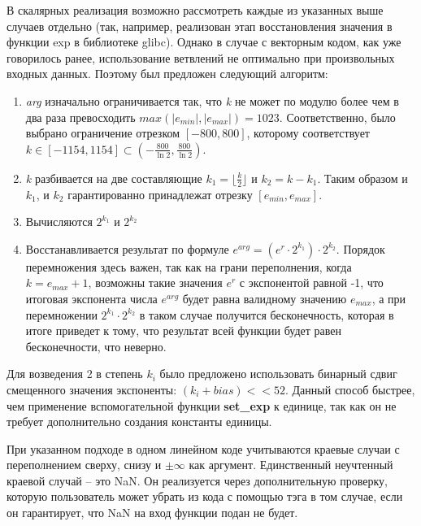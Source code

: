 В скалярных реализация возможно рассмотреть каждые из указанных выше случаев отдельно (так, например, реализован этап восстановления значения в функции exp в библиотеке glibc).
Однако в случае с векторным кодом, как уже говорилось ранее, использование ветвлений не оптимально при произвольных входных данных.
Поэтому был предложен следующий алгоритм:

\begin{enumerate}
    \item \textit{arg} изначально ограничивается так, что \textit{k} не может по модулю более чем в два раза превосходить $max(|e_{min}|, |e_{max}|) = 1023$.
    Соответственно, было выбрано ограничение отрезком $[-800, 800]$, которому соответствует $k \in [-1154, 1154] \subset (-\frac{800}{\ln{2}}, \frac{800}{\ln{2}})$.
    \item \textit{k} разбивается на две составляющие $k_1 = \lfloor \frac{k}{2} \rfloor$ и $k_2 = k - k_1$.
    Таким образом и $k_1$, и $k_2$ гарантированно принадлежат отрезку $[e_{min}, e_{max}]$.
    \item Вычисляются $2^{k_1}$ и $2^{k_2}$
    \item Восстанавливается результат по формуле $e^{arg} = (e^r \cdot 2^{k_1}) \cdot 2^{k_2}$. Порядок перемножения здесь важен, так как на грани переполнения, когда $k = e_{max} + 1$, возможны такие значения $e^r$ с экспонентой равной -1, что итоговая экспонента числа $e^{arg}$ будет равна валидному значению $e_{max}$, а при перемножении $2^{k_1} \cdot 2^{k_2}$ в таком случае получится бесконечность, которая в итоге приведет к тому, что результат всей функции будет равен бесконечности, что неверно.
\end{enumerate}

Для возведения 2 в степень $k_i$ было предложено использовать бинарный сдвиг смещенного значения экспоненты: $(k_i + bias) << 52$.
Данный способ быстрее, чем применение вспомогательной функции \textbf{set\_exp} к единице, так как он не требует дополнительно создания константы единицы.

При указанном подходе в одном линейном коде учитываются краевые случаи с переполнением сверху, снизу и $\pm \infty$ как аргумент.
Единственный неучтенный краевой случай -- это NaN.
Он реализуется через дополнительную проверку, которую пользователь может убрать из кода с помощью тэга в том случае, если он гарантирует, что NaN на вход функции подан не будет.